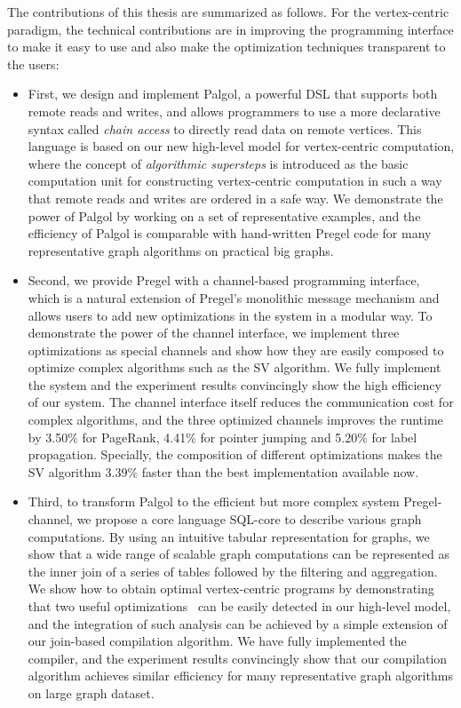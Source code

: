 \documentclass{sokendai_thesis} %
\begin{document}
The contributions of this thesis are summarized as follows.
For the vertex-centric paradigm, the technical contributions are in improving the programming interface to make it easy to use and also make the optimization techniques transparent to the users:
\begin{itemize}
\item
  First, we design and implement Palgol, a powerful DSL that supports both remote reads and writes, and allows programmers to use a more declarative syntax called \emph{chain access} to directly read data on remote vertices.
  This language is based on our new high-level model for vertex-centric computation, where the concept of \emph{algorithmic supersteps} is introduced as the basic computation unit for constructing vertex-centric computation in such a way that remote reads and writes are ordered in a safe way.
  We demonstrate the power of Palgol by working on a set of representative examples, and the efficiency of Palgol is comparable with hand-written Pregel code for many representative graph algorithms on practical big graphs.

\item
  Second, we provide Pregel with a channel-based programming interface, which is a natural extension of Pregel's monolithic message mechanism and allows users to add new optimizations in the system in a modular way.
  To demonstrate the power of the channel interface, we implement three optimizations as special channels and show how they are easily composed to optimize complex algorithms such as the SV algorithm.
  We fully implement the system and the experiment results convincingly show the high efficiency of our system.
  The channel interface itself reduces the communication cost for complex algorithms, and the three optimized channels improves the runtime by 3.50$\%$ for PageRank, 4.41$\%$ for pointer jumping and 5.20$\%$ for label propagation.
  Specially, the composition of different optimizations makes the SV algorithm 3.39$\%$ faster than the best implementation available now.

\item
  Third, to transform Palgol to the efficient but more complex system Pregel-channel, we propose a core language SQL-core to describe various graph computations.
  By using an intuitive tabular representation for graphs, we show that a wide range of scalable graph computations can be represented as the inner join of a series of tables followed by the filtering and aggregation.
  We show how to obtain optimal vertex-centric programs by demonstrating that two useful optimizations~\cite{yan2015effective,zhang2019composing} can be easily detected in our high-level model, and the integration of such analysis can be achieved by a simple extension of our join-based compilation algorithm.
  We have fully implemented the compiler, and the experiment results convincingly show that our compilation algorithm achieves similar efficiency for many representative graph algorithms on large graph dataset.
\end{itemize}
\end{document}
